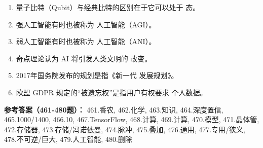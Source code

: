 \begin{enumerate}[resume,leftmargin=2em,itemsep=1pt]
\item 量子比特（Qubit）与经典比特的区别在于它可以处于 \underline{\hspace{3em}} 态。
\item 强人工智能有时也被称为 \underline{\hspace{3em}} 人工智能（AGI）。
\item 弱人工智能有时也被称为 \underline{\hspace{3em}} 人工智能（ANI）。
\item 奇点理论认为 AI 将引发人类文明的 \underline{\hspace{3em}} 改变。
\item 2017年国务院发布的规划是指《新一代 \underline{\hspace{3em}} 发展规划》。
\item 欧盟 GDPR 规定的“被遗忘权”是指用户有权要求 \underline{\hspace{3em}} 个人数据。
\end{enumerate}

\textbf{参考答案（461-480题）：}
461.香农, 462.化学, 463.知识, 464.深度置信, 465.1000/1400, 466.10, 467.TensorFlow, 468.计算, 469.计算, 470.模型, 471.晶体管, 472.存储器, 473.存储/冯诺依曼, 474.脉冲, 475.叠加, 476.通用, 477.专用/狭义, 478.不可逆/巨大, 479.人工智能, 480.删除

